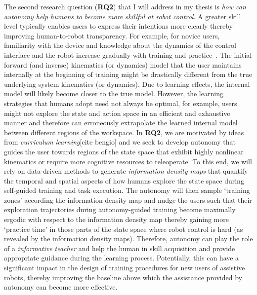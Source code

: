 \documentclass[12pt]{article}
\begin{document}
The second research question (\textbf{RQ2}) that I will address in my thesis is \textit{how can autonomy help humans to become more skillful at robot control}. A greater skill level typically enables users to express their intentions more clearly thereby improving human-to-robot transparency. 
For example, for novice users, familiarity with the device and knowledge about the dynamics of the control interface and the robot increase gradually with training and practice~\cite{mussaivaldi2000motor}. The initial forward (and inverse) kinematics (or dynamics) model that the user maintains internally at the beginning of training might be drastically different from the true underlying system kinematics (or dynamics). Due to learning effects, the internal model will likely become closer to the true model. However, the learning strategies that humans adopt need not always be optimal, for example, users might not explore the state and action space in an efficient and exhaustive manner and therefore can erroneously extrapolate the learned internal model between different regions of the workspace. In \textbf{RQ2}, we are motivated by ideas from \textit{curriculum learning}[cite bengio] and we seek to develop autonomy that guides the user towards regions of the state space that exhibit highly nonlinear kinematics or require more cognitive resources to teleoperate. To this end, we will rely on data-driven methods to generate  \textit{information density maps} that quantify the temporal and spatial aspects of how humans explore the state space during self-guided training and task execution. The autonomy will then sample `training zones' according the information density map and nudge the users such that their exploration trajectories during autonomy-guided training become maximally ergodic with respect to the information density map thereby gaining more `practice time' in those parts of the state space where robot control is hard (as revealed by the information density maps). Therefore, autonomy can play the role of a \textit{informative teacher} and help the human in skill acquisition and provide appropriate guidance during the learning process. Potentially, this can have a significant impact in the design of training procedures for new users of assistive robots, thereby improving the baseline above which the assistance provided by autonomy can become more effective. 
\end{document}
